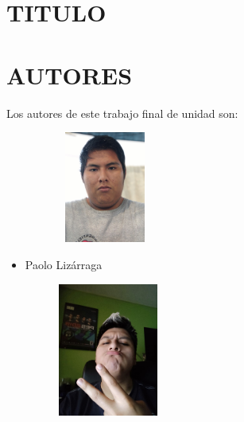 \documentclass[12pt]{article}
\begin{document}
\begin{multicols}{2}
\section{TITULO}

\par

\section{AUTORES}

\vspace{\baselineskip}
{\fontsize{9pt}{10.8pt}\selectfont Los autores de este trabajo final de unidad son:\par}\par


\vspace{\baselineskip}



\begin{figure}[H]		\includegraphics[width=1.75in,height=1.44in]{./media/image1.png}
\end{figure}



\begin{itemize}
	\item {\fontsize{9pt}{10.8pt}\selectfont Paolo Lizárraga\par}\par


\end{itemize}
\vspace{\baselineskip}


\begin{figure}[H]		\includegraphics[width=1.84in,height=1.72in]{./media/image2.png}
\end{figure}



\end{multicols}
\end{document}

